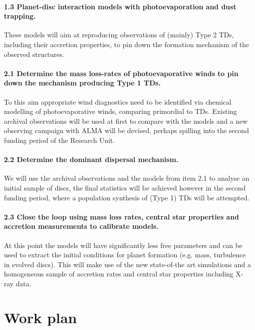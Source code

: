 \documentclass[12pt]{article}
\begin{document}
\paragraph {1.3 Planet-disc interaction models with photoevaporation
  and dust trapping.} These models will aim at reproducing
observations of (mainly) Type 2 TDs, including their accretion properties, to pin down the formation mechanism of the observed structures. 

\paragraph{2.1 Determine the mass loss-rates of photoevaporative winds
  to pin down the mechanism producing Type 1 TDs.} To
this aim appropriate wind diagnostics need to be identified via
chemical modelling of  photoevaporative winds, comparing primordial to
TDs. Existing archival observations will be used at first to compare
with the models and a new observing campaign with ALMA will be
devised, perhaps spilling into the second funding period of the Research Unit.
\paragraph{2.2 Determine the dominant dispersal mechanism.} We will
use the archival observations and the models from item 2.1 to analyse
an initial sample of discs, the final statistics will be achieved
however in the second funding period, where a population synthesis of
(Type 1) TDs will be attempted.
\paragraph {2.3 Close the loop using mass loss rates, central star
  properties and accretion measurements to calibrate models.}  At this
point the models will have significantly less free parameters and can
be used to extract the initial conditions for planet formation
(e.g. mass, turbulence in evolved discs). This will make use of the new state-of-the
art simulations and a homogeneous sample of accretion rates and central
star properties including X-ray data. 

\section*{Work plan}
\end{document}
